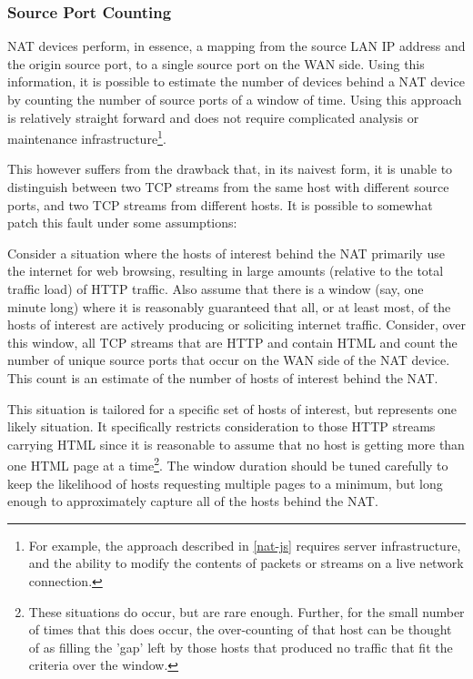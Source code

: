 \documentclass{article}
\theoremstyle{remark}
\theoremstyle{definition}
\theoremstyle{definition}
\theoremstyle{definition}
\begin{document}
\subsubsection{Source Port Counting}
NAT devices perform, in essence, a mapping from the source LAN IP address and the origin source port, to a single source port on the WAN side. Using this information, it is possible to estimate the number of devices behind a NAT device by counting the number of source ports of a window of time. Using this approach is relatively straight forward and does not require complicated analysis or maintenance infrastructure\footnote{For example, the approach described in \ref{nat-js} requires server infrastructure, and the ability to modify the contents of packets or streams on a live network connection.}.

This however suffers from the drawback that, in its naivest form, it is unable to distinguish between two TCP streams from the same host with different source ports, and two TCP streams from different hosts. It is possible to somewhat patch this fault under some assumptions:

Consider a situation where the hosts of interest behind the NAT primarily use the internet for web browsing, resulting in large amounts (relative to the total traffic load) of HTTP traffic. Also assume that there is a window (say, one minute long) where it is reasonably guaranteed that all, or at least most, of the hosts of interest are actively producing or soliciting internet traffic. Consider, over this window, all TCP streams that are HTTP and contain HTML and count the number of unique source ports that occur on the WAN side of the NAT device. This count is an estimate of the number of hosts of interest behind the NAT.

This situation is tailored for a specific set of hosts of interest, but represents one likely situation. It specifically restricts consideration to those HTTP streams carrying HTML since it is reasonable to assume that no host is getting more than one HTML page at a time\footnote{These situations do occur, but are rare enough. Further, for the small number of times that this does occur, the over-counting of that host can be thought of as filling the 'gap' left by those hosts that produced no traffic that fit the criteria over the window.}. The window duration should be tuned carefully to keep the likelihood of hosts requesting multiple pages to a minimum, but long enough to approximately capture all of the hosts behind the NAT.
\end{document}
